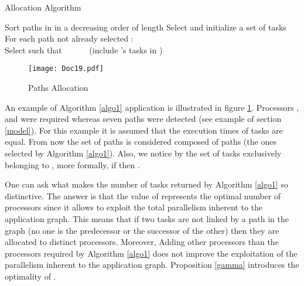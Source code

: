 \documentclass{ijcaArticle}
\begin{document}
\begin{algorithm} 
\caption{Allocation Algorithm} 
\label{algo1} \begin{algorithmic}[1] 
\STATE   
\STATE Sort paths in  in a decreasing order of length
\STATE Select   and initialize a set of tasks   
\WHILE{} 
\STATE For each path  not already selected : \\  
\STATE Select  such that  
\STATE   \ \ \ \ \ \ (include \rq{}s tasks in  )
\STATE 
\ENDWHILE 
\end{algorithmic} 
\end{algorithm}

\begin{figure}[h!] 
\begin{center} 
\texttt{[image: Doc19.pdf]} 
\caption{Paths Allocation} 
\label{cons-clust-exam} \end{center} 
\end{figure}
 
An example of Algorithm \ref{algo1} application is illustrated in figure \ref{cons-clust-exam}. Processors ,  and  were required whereas seven paths were detected (see example of section \ref{model}). For this example it is assumed that the execution times of tasks are equal.  From now the set of paths 
 is considered composed of  paths (the ones selected by Algorithm \ref{algo1}). Also, we notice by  the set of tasks exclusively belonging to , more formally, if   then . 

 
One can ask what makes the number of tasks returned by Algorithm \ref{algo1} so distinctive. The answer is that the value of  represents the optimal number of processors since it allows to exploit the total parallelism inherent to the application graph. This means that if two tasks are not linked by a path in the graph (no one is the predecessor or the successor of the other) then
they are allocated to distinct processors. Moreover,  Adding other processors than the  processors required by Algorithm \ref{algo1} does not improve the exploitation of the parallelism inherent to the application graph. Proposition \ref{gamma} introduces the optimality of .
\end{document}
